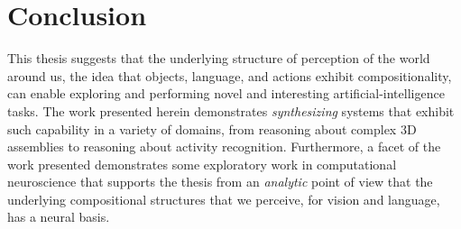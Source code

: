 \chapter{Conclusion}

This thesis suggests that the underlying structure of perception of the world
around us, the idea that objects, language, and actions exhibit
compositionality, can enable exploring and performing novel and interesting
artificial-intelligence tasks.
%
The work presented herein demonstrates \emph{synthesizing} systems that exhibit
such capability in a variety of domains, from reasoning about complex 3D
assemblies to reasoning about activity recognition.
%
Furthermore, a facet of the work presented demonstrates some exploratory work
in computational neuroscience that supports the thesis from an \emph{analytic}
point of view that the underlying compositional structures that we perceive,
for vision and language, has a neural basis.

